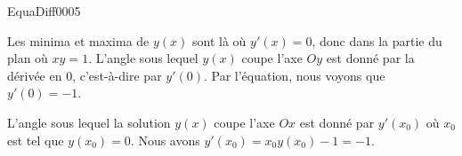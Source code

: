 \begin{corrige}{EquaDiff0005}

Les minima et maxima de $y(x)$ sont là où $y'(x)=0$, donc dans la partie du plan où $xy=1$. L'angle sous lequel $y(x)$ coupe l'axe $Oy$ est donné par la dérivée en $0$, c'est-à-dire par $y'(0)$. Par l'équation, nous voyons que $y'(0)=-1$.

L'angle sous lequel la solution $y(x)$ coupe l'axe $Ox$ est donné par $y'(x_0)$ où $x_0$ est tel que $y(x_0)=0$. Nous avons $y'(x_0)=x_0y(x_0)-1=-1$.

\end{corrige}
